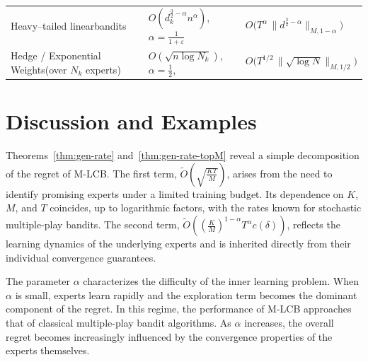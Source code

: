 \documentclass[a4paper,14pt]{extarticle}
\theoremstyle{plain}
\newcommand{\algname}[1]{{\textsf  #1}}
\begin{document}
\begin{table}[h!]
{\begin{tabular}{p{6cm} p{4.9cm} p{4cm}}
Heavy–tailed linear\newline bandits~\cite{tajdini2025improved}
& $O(d_k^{\frac{3}{2} - \alpha} n^{\alpha})$, $\alpha=\tfrac{1}{1 + \varepsilon}$
& $O\big(T^{\alpha}\,\|d^{\frac{3}{2} - \alpha}\|_{M,1 - \alpha}\big)$ \\[10pt]

Hedge / Exponential Weights\newline (over $N_k$ experts)
& $O(\sqrt{n\log N_k})$, $\alpha=\tfrac{1}{2}$,
& $O\!\big(T^{1/2}\,\|\sqrt{\log N}\|_{M,1/2}\big)$ \\
\bottomrule
\end{tabular}
}
\end{table}

\section{Discussion and Examples}
\label{sec:comparison}

Theorems~\ref{thm:gen-rate} and~\ref{thm:gen-rate-topM} reveal a simple decomposition of the regret of \algname{M-LCB}. The first term, $\tilde O\!\left(\sqrt{\frac{KT}{M}}\right)$, arises from the need to identify promising experts under a limited training budget. Its dependence on $K$, $M$, and $T$ coincides, up to logarithmic factors, with the rates known for stochastic multiple-play bandits. The second term, $\tilde O\!\left( \left(\frac{K}{M}\right)^{1-\alpha} T^\alpha c(\delta) \right)$,
reflects the learning dynamics of the underlying experts and is inherited directly from their individual convergence guarantees.

The parameter $\alpha$ characterizes the difficulty of the inner learning problem. When $\alpha$ is small, experts learn rapidly and the exploration term becomes the dominant component of the regret. In this regime, the performance of \algname{M-LCB} approaches that of classical multiple-play bandit algorithms. As $\alpha$ increases, the overall regret becomes increasingly influenced by the convergence properties of the experts themselves.
\end{document}
